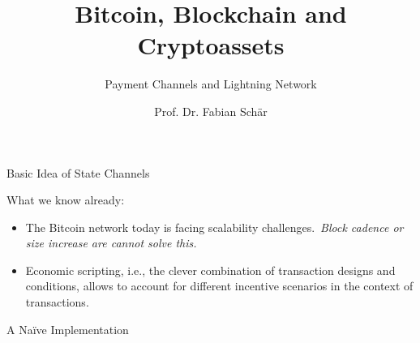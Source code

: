 \documentclass[]{beamer}
\title{Bitcoin, Blockchain and Cryptoassets}
\subtitle{Payment Channels and Lightning Network}
\author{Prof. Dr. Fabian Schär}
\institute{University of Basel}
\begin{document}
\thispagestyle{empty}
\begin{frame}[noframenumbering]
	\titlepage
\end{frame}

\begin{frame}{Basic Idea of State Channels}

What we know already:
\begin{itemize}
	\item The Bitcoin network today is facing scalability challenges.\ \textit{Block cadence or size increase are cannot solve this.}
	\item Economic scripting, i.e., the clever combination of transaction designs and conditions, allows to account for different incentive scenarios in the context of transactions.
\end{itemize}

\vspace{1.5 em}


\end{frame}

\begin{frame}{A Naïve Implementation}


\end{frame}
\end{document}

